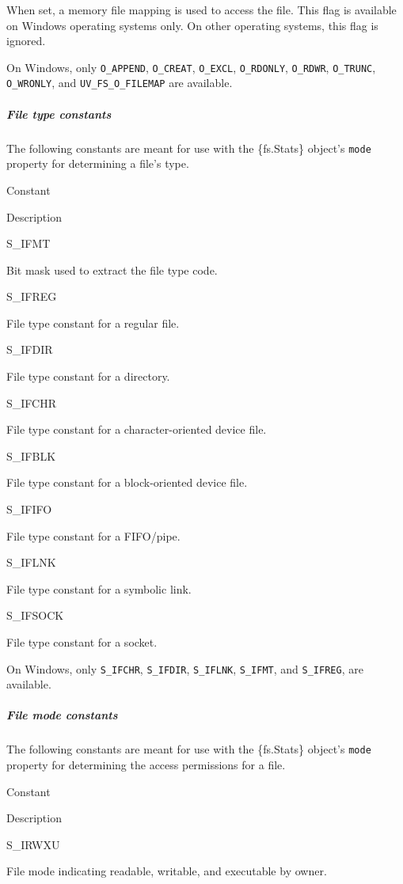 When set, a memory file mapping is used to access the file. This flag is
available on Windows operating systems only. On other operating systems,
this flag is ignored.

On Windows, only \texttt{O\_APPEND}, \texttt{O\_CREAT},
\texttt{O\_EXCL}, \texttt{O\_RDONLY}, \texttt{O\_RDWR},
\texttt{O\_TRUNC}, \texttt{O\_WRONLY}, and \texttt{UV\_FS\_O\_FILEMAP}
are available.

\subparagraph{File type constants}\label{file-type-constants}

The following constants are meant for use with the \{fs.Stats\} object's
\texttt{mode} property for determining a file's type.

Constant

Description

S\_IFMT

Bit mask used to extract the file type code.

S\_IFREG

File type constant for a regular file.

S\_IFDIR

File type constant for a directory.

S\_IFCHR

File type constant for a character-oriented device file.

S\_IFBLK

File type constant for a block-oriented device file.

S\_IFIFO

File type constant for a FIFO/pipe.

S\_IFLNK

File type constant for a symbolic link.

S\_IFSOCK

File type constant for a socket.

On Windows, only \texttt{S\_IFCHR}, \texttt{S\_IFDIR},
\texttt{S\_IFLNK}, \texttt{S\_IFMT}, and \texttt{S\_IFREG}, are
available.

\subparagraph{File mode constants}\label{file-mode-constants}

The following constants are meant for use with the \{fs.Stats\} object's
\texttt{mode} property for determining the access permissions for a
file.

Constant

Description

S\_IRWXU

File mode indicating readable, writable, and executable by owner.

